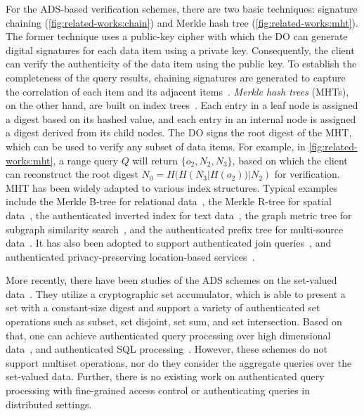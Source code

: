 For the ADS-based verification schemes, there are two basic techniques: signature chaining (\cref{fig:related-works:chain}) and Merkle hash tree (\cref{fig:related-works:mht}). The former technique uses a public-key cipher with which the DO can generate digital signatures for each data item using a private key. Consequently, the client can verify the authenticity of the data item using the public key. To establish the completeness of the query results, chaining signatures are generated to capture the correlation of each item and its adjacent items~\cite{10.1109/ICDE.2004.1320027}. \emph{Merkle hash trees} (MHTs), on the other hand, are built on index trees~\cite{10.1007/0-387-34805-0_21}. Each entry in a leaf node is assigned a digest based on its hashed value, and each entry in an internal node is assigned a digest derived from its child nodes. The DO signs the root digest of the MHT, which can be used to verify any subset of data items. For example, in \cref{fig:related-works:mht}, a range query $Q$ will return $\{o_2, N_2, N_3\}$, based on which the client can reconstruct the root digest $N_0 = H( H(N_3 | H(o_2))| N_2)$ for verification. MHT has been widely adapted to various index structures. Typical examples include the Merkle B-tree for relational data~\cite{10.1145/1142473.1142488}, the Merkle R-tree for spatial data~\cite{10.1007/s00778-008-0113-2,10.1109/icde.2011.5767829}, the authenticated inverted index for text data~\cite{10.14778/1453856.1453875}, the graph metric tree for subgraph similarity search~\cite{10.1109/tkde.2014.2316818}, and the authenticated prefix tree for multi-source data~\cite{10.1145/2723372.2747649}. It has also been adopted to support authenticated join queries~\cite{10.1145/1559845.1559849}, and authenticated privacy-preserving location-based services~\cite{10.1145/2213836.2213871,10.1109/icde.2013.6544932,10.14778/2732219.2732224}.

More recently, there have been studies of the ADS schemes on the set-valued data~\cite{10.1007/978-3-642-22792-9_6,10.1007/978-3-642-54631-0_7,10.1109/eurosp.2017.35}. They utilize a cryptographic set accumulator, which is able to present a set with a constant-size digest and support a variety of authenticated set operations such as subset, set disjoint, set sum, and set intersection. Based on that, one can achieve authenticated query processing over high dimensional data~\cite{10.1145/2660267.2660373}, and authenticated SQL processing~\cite{10.1145/2810103.2813711}. However, these schemes do not support multiset operations, nor do they consider the aggregate queries over the set-valued data. Further, there is no existing work on authenticated query processing with fine-grained access control or authenticating queries in distributed settings. %

